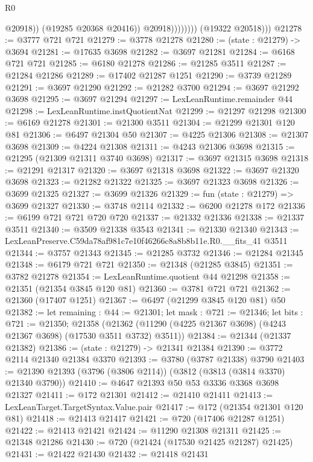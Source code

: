 \begin{lexlean}{R0}
\begin{coremodule}
                              @20918))
                          (@19285 @20368 @20416))
                        @20918))))))))
        (@19322 @20518)))
@21278 := @3777 @721 @721
@21279 := @3778 @21278
@21280 := (state : @21279) -> @3694
@21281 := @17635 @3698
@21282 := @3697 @21281
@21284 := @6168 @721 @721
@21285 := @6180 @21278
@21286 := @21285 @3511
@21287 := @21284 @21286
@21289 := @17402 @21287 @1251
@21290 := @3739 @21289
@21291 := @3697 @21290
@21292 := @21282 @3700
@21294 := @3697 @21292 @3698
@21295 := @3697 @21294
@21297 := LexLeanRuntime.remainder @44
@21298 := LexLeanRuntime.instQuotientNat
@21299 := @21297 @21298
@21300 := @6169 @21278
@21301 := @21300 @3511
@21304 := @21299 @21301 @120 @81
@21306 := @6497 @21304 @50
@21307 := @4225 @21306
@21308 := @21307 @3698
@21309 := @4224 @21308
@21311 := @4243 @21306 @3698
@21315 := @21295 (@21309 @21311 @3740 @3698)
@21317 := @3697 @21315 @3698
@21318 := @21291 @21317
@21320 := @3697 @21318 @3698
@21322 := @3697 @21320 @3698
@21323 := @21282 @21322
@21325 := @3697 @21323 @3698
@21326 := @3699 @21325
@21327 := @3699 @21326
@21329 := fun (state : @21279) => @3699 @21327
@21330 := @3748 @2114
@21332 := @6200 @21278 @172
@21336 := @6199 @721 @721 @720 @720
@21337 := @21332 @21336
@21338 := @21337 @3511
@21340 := @3509 @21338 @3543
@21341 := @21330 @21340
@21343 := LexLeanPreserve.C59da78af981c7e10f46266c8a8b8b11e.R0.__fits_41 @3511
@21344 := @3757 @21343
@21345 := @21285 @3732
@21346 := @21284 @21345
@21348 := @6179 @721 @721
@21350 := @21348 (@21285 @3845)
@21351 := @3782 @21278
@21354 := LexLeanRuntime.quotient @44 @21298
@21358 := @21351 (@21354 @3845 @120 @81)
@21360 := @3781 @721 @721
@21362 := @21360 (@17407 @1251)
@21367 := @6497 (@21299 @3845 @120 @81) @50
@21382 := let remaining : @44 := @21301;
  let mask : @721 := @21346;
  let bits : @721 := @21350;
  @21358 (@21362 (@11290 (@4225 @21367 @3698) (@4243 @21367 @3698) (@17530 @3511 @3732) @3511))
@21384 := @21344 (@21337 @21382)
@21386 := (state : @21279) -> @21341 @21384
@21390 := @3772 @2114 @21340 @21384 @3370
@21393 := @3780 (@3787 @21338) @3790
@21403 := @21390 @21393 (@3796 (@3806 @2114)) (@3812 (@3813 (@3814 @3370) @21340 @3790))
@21410 := @4647 @21393 @50 @53 @3336 @3368 @3698 @21327
@21411 := @172 @21301
@21412 := @21410 @21411
@21413 := LexLeanTarget.TargetSyntax.Value.pair
@21417 := @172 (@21354 @21301 @120 @81)
@21418 := @21413 @21417
@21421 := @720 (@17406 @21287 @1251)
@21422 := @21413 @21421
@21424 := @11290 @21308 @21311
@21425 := @21348 @21286
@21430 := @720 (@21424 (@17530 @21425 @21287) @21425)
@21431 := @21422 @21430
@21432 := @21418 @21431

\end{coremodule}
\end{lexlean}
